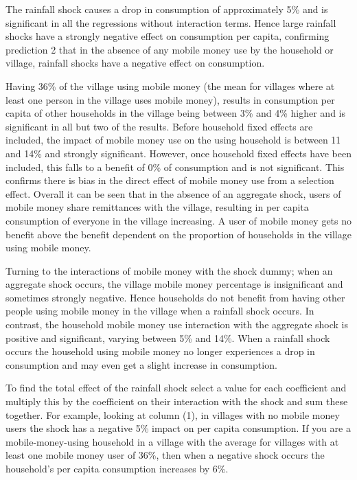 The rainfall shock causes a drop in consumption of approximately 5\% and is  significant in all the regressions without interaction terms. Hence large rainfall shocks have a strongly negative effect on consumption per capita, confirming prediction 2 that in the absence of any mobile money use by the household or village, rainfall shocks have a negative effect on consumption.  

Having 36\% of the village using mobile money (the mean for villages where at least one person in the village uses mobile money), results in consumption per capita of other households in the village being between 3\% and 4\% higher and is  significant in all but two of the results. Before household fixed effects are included, the impact of mobile money use on the using household is between 11 and 14\% and strongly significant. However, once household fixed effects have been included, this falls to a benefit of 0\% of consumption and is not significant. This confirms there is bias in the direct effect of mobile money use from a selection effect. Overall it can be seen that in the absence of an aggregate shock, users of mobile money share remittances with the village, resulting in per capita consumption of everyone in the village increasing. A user of mobile money gets no benefit above the benefit dependent on the proportion of households in the village using mobile money. 

Turning to the interactions of mobile money with the shock dummy; when an aggregate shock occurs, the village mobile money percentage is insignificant and sometimes strongly negative. Hence households do not benefit from having other people using mobile money in the village when a rainfall shock occurs. In contrast, the household mobile money use interaction with the aggregate shock is positive and significant, varying between 5\% and 14\%. When a rainfall shock occurs the household using mobile money no longer experiences a drop in consumption and may even get a slight increase in consumption. 

To find the total effect of the rainfall shock select a value for each coefficient and multiply this by the coefficient on their interaction with the shock and sum these together. For example, looking at column (1), in villages with no mobile money users the shock has a negative 5\% impact on per capita consumption. If you are a mobile-money-using household in a village with the average for villages with at least one mobile money user of 36\%, then when a negative shock occurs the household's per capita consumption increases by 6\%. 

